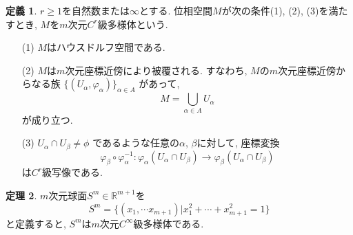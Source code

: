 \documentclass[a4j,12pt]{jarticle}
\theoremstyle{definition}
\newtheorem{theorem}{定理}[section]
\newtheorem{definition}[theorem]{定義}
\begin{document}
\begin{definition}\label{def:C^r manifold}
    $r\geq 1$を自然数または$\infty$とする. 
    位相空間$M$が次の条件(1), (2), (3)を満たすとき, 
    $M$を$m$次元$C^r$級多様体という.
    \begin{itemize}
        \item[(1)]$M$はハウスドルフ空間である.
        \item[(2)]$M$は$m$次元座標近傍により被覆される. 
        すなわち, $M$の$m$次元座標近傍からなる族
        $\{(U_\alpha, \varphi_\alpha)\}_{\alpha \in A}$
        があって, 
        $$M = \bigcup_{\alpha \in A}U_\alpha$$
        が成り立つ. 
        \item[(3)]$U_\alpha \cap U_\beta \neq \phi$
        であるような任意の$\alpha$, $\beta$に対して, 座標変換
        $$\varphi_\beta \circ \varphi_\alpha^{-1}:
        \varphi_\alpha(U_\alpha\cap U_\beta)\rightarrow 
        \varphi_\beta(U_\alpha\cap U_\beta)$$
        は$C^r$級写像である. 
    \end{itemize}
\end{definition}
\begin{theorem}
    $m$次元球面$S^m \in \mathbb{R}^{m+1}$を
    $$S^m=\{(x_1,\cdots x_{m+1})|x_1^2+\cdots +x_{m+1}^2=1\}$$
    と定義すると, $S^m$は$m$次元$C^{\infty}$級多様体である. 
\end{theorem}
\end{document}
